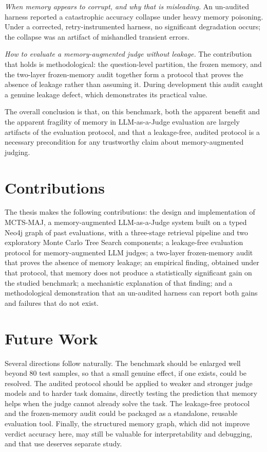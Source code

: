 \documentclass[14pt,a4paper]{extreport}
\begin{document}
\emph{When memory appears to corrupt, and why that is misleading.} An un-audited harness reported a catastrophic accuracy collapse under heavy memory poisoning. Under a corrected, retry-instrumented harness, no significant degradation occurs; the collapse was an artifact of mishandled transient errors.

\emph{How to evaluate a memory-augmented judge without leakage.} The contribution that holds is methodological: the question-level partition, the frozen memory, and the two-layer frozen-memory audit together form a protocol that proves the absence of leakage rather than assuming it. During development this audit caught a genuine leakage defect, which demonstrates its practical value.

The overall conclusion is that, on this benchmark, both the apparent benefit and the apparent fragility of memory in LLM-as-a-Judge evaluation are largely artifacts of the evaluation protocol, and that a leakage-free, audited protocol is a necessary precondition for any trustworthy claim about memory-augmented judging.

\section{Contributions}

The thesis makes the following contributions: the design and implementation of MCTS-MAJ, a memory-augmented LLM-as-a-Judge system built on a typed Neo4j graph of past evaluations, with a three-stage retrieval pipeline and two exploratory Monte Carlo Tree Search components; a leakage-free evaluation protocol for memory-augmented LLM judges; a two-layer frozen-memory audit that proves the absence of memory leakage; an empirical finding, obtained under that protocol, that memory does not produce a statistically significant gain on the studied benchmark; a mechanistic explanation of that finding; and a methodological demonstration that an un-audited harness can report both gains and failures that do not exist.

\section{Future Work}

Several directions follow naturally. The benchmark should be enlarged well beyond 80 test samples, so that a small genuine effect, if one exists, could be resolved. The audited protocol should be applied to weaker and stronger judge models and to harder task domains, directly testing the prediction that memory helps when the judge cannot already solve the task. The leakage-free protocol and the frozen-memory audit could be packaged as a standalone, reusable evaluation tool. Finally, the structured memory graph, which did not improve verdict accuracy here, may still be valuable for interpretability and debugging, and that use deserves separate study.
\end{document}

